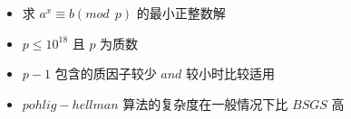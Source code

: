 \documentclass[E:/GsjzTle/main/main.tex]{subfiles}
\begin{document}
\begin{itemize}
\item
  求 \(a^x \equiv b(mod~~p)\) 的最小正整数解
\item
  \(p\leq10^{18}\) 且 \(p\) 为质数
\item
  \(p-1\) 包含的质因子较少 \(and\) 较小时比较适用
\item
  \(pohlig-hellman\) 算法的复杂度在一般情况下比 \(BSGS\) 高
\end{itemize}
\end{document}
